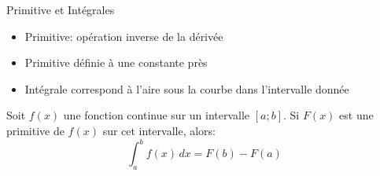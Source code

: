 \documentclass[xcolor=table]{beamer}
\begin{document}
\begin{frame}{Primitive et Intégrales}
    \begin{itemize}
        \item Primitive: opération inverse de la dérivée
        \item Primitive définie à une constante près
        \item Intégrale correspond à l'aire sous la courbe dans l'intervalle donnée
    \end{itemize}
    \begin{tcolorbox}[title=Théorème fondamental de l'analyse (part 2), enlarge top by=1mm, enlarge bottom by=1mm]
Soit $f(x)$ une fonction continue sur un intervalle $[a;b]$. Si $F(x)$ est une primitive de $f(x)$ sur cet intervalle, alors:
\[\int_{a}^{b}f(x) \,dx = F(b) - F(a)\]
\end{tcolorbox}
    
\end{frame}
\end{document}
